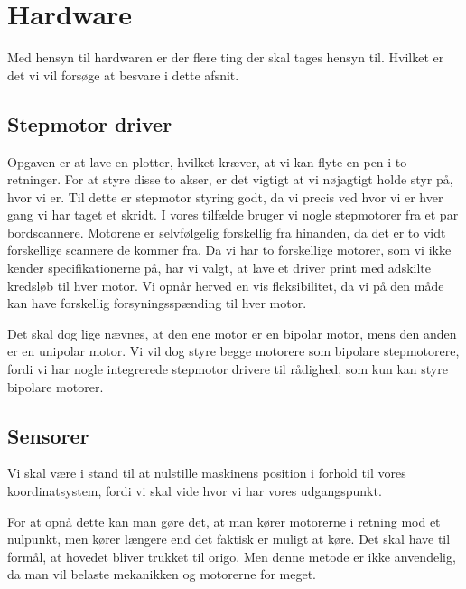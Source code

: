 \chapter[Design af hardware]{Hardware}
\label{ch:d-hardware}


Med hensyn til hardwaren er der flere ting der skal tages hensyn
til. Hvilket er det vi vil forsøge at besvare i dette afsnit.

\section{Stepmotor driver}
Opgaven er at lave en plotter, hvilket kræver, at vi kan flyte en pen
i to retninger. For at styre disse to akser, er det vigtigt at vi
nøjagtigt holde styr på, hvor vi er. Til dette er stepmotor styring
godt, da vi precis ved hvor vi er hver gang vi har taget et skridt. I
vores tilfælde bruger vi nogle stepmotorer fra et par
bordscannere. Motorene er selvfølgelig forskellig fra hinanden, da det
er to vidt forskellige scannere de kommer fra. Da vi har to
forskellige motorer, som vi ikke kender specifikationerne på, har vi
valgt, at lave et driver print med adskilte kredsløb til hver
motor. Vi opnår herved en vis fleksibilitet, da vi på den måde kan
have forskellig forsyningsspænding til hver motor.

Det skal dog lige nævnes, at den ene motor er en bipolar motor, mens
den anden er en unipolar motor. Vi vil dog styre begge motorere som
bipolare stepmotorere, fordi vi har nogle integrerede stepmotor
drivere til rådighed, som kun kan styre bipolare motorer.

\section{Sensorer}
Vi skal være i stand til at nulstille maskinens position i forhold til
vores koordinatsystem, fordi vi skal vide hvor vi har vores
udgangspunkt.

For at opnå dette kan man gøre det, at man kører motorerne i retning
mod et nulpunkt, men kører længere end det faktisk er muligt at
køre. Det skal have til formål, at hovedet bliver trukket til
origo. Men denne metode er ikke anvendelig, da man vil belaste
mekanikken og motorerne for meget.

